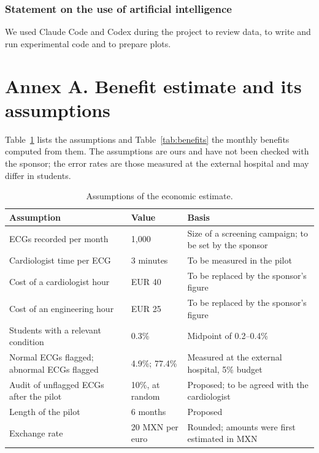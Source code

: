 \documentclass[letterpaper,11pt]{article}
\begin{document}
\subsubsection*{Statement on the use of artificial intelligence}
{\footnotesize We used Claude Code \parencite{anthropic2026claude} and Codex \parencite{openai2026codex} during the project to review data, to write and run experimental code and to prepare plots.}

\printbibliography[heading=subbibliography,title={References}]

\clearpage
\appendix
\section*{Annex A. Benefit estimate and its assumptions}

Table~\ref{tab:assumptions} lists the assumptions and Table~\ref{tab:benefits} the monthly benefits computed from them. The assumptions are ours and have not been checked with the sponsor; the error rates are those measured at the external hospital and may differ in students.

\begin{table}[H]
  \centering
  \caption{Assumptions of the economic estimate.}
  \label{tab:assumptions}
  \small
  \begin{tabular}{p{6.2cm}p{3.0cm}p{6.0cm}}
    \toprule
    Assumption & Value & Basis \\
    \midrule
    ECGs recorded per month & 1,000 & Size of a screening campaign; to be set by the sponsor \\
    Cardiologist time per ECG & 3 minutes & To be measured in the pilot \\
    Cost of a cardiologist hour & EUR 40 & To be replaced by the sponsor's figure \\
    Cost of an engineering hour & EUR 25 & To be replaced by the sponsor's figure \\
    Students with a relevant condition & 0.3\% & Midpoint of 0.2--0.4\% \parencite{drezner2016electrocardiographic,williams2019performance} \\
    Normal ECGs flagged; abnormal ECGs flagged & 4.9\%; 77.4\% & Measured at the external hospital, 5\% budget \\
    Audit of unflagged ECGs after the pilot & 10\%, at random & Proposed; to be agreed with the cardiologist \\
    Length of the pilot & 6 months & Proposed \\
    Exchange rate & 20 MXN per euro & Rounded; amounts were first estimated in MXN \\
    \bottomrule
  \end{tabular}
\end{table}
\end{document}
